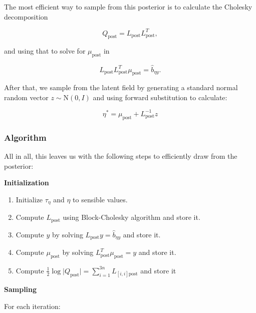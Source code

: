 \documentclass[
  letterpaper,
  DIV=11,
  numbers=noendperiod]{scrartcl}
\providecommand{\tightlist}{%
  \setlength{\itemsep}{0pt}\setlength{\parskip}{0pt}}\usepackage{longtable,booktabs,array}
\begin{document}
The most efficient way to sample from this posterior is to calculate the
Cholesky decomposition

\[
Q_{\text{post}} = L_{\text{post}}L_{\text{post}}^T,
\]

and using that to solve for \(\mu_\text{post}\) in

\[
L_{\text{post}}L_{\text{post}}^T \mu_\text{post} = \hat b_{\eta y}.
\]

After that, we sample from the latent field by generating a standard
normal random vector \(z \sim \mathrm N(0, I)\) and using forward
substitution to calculate:

\[
\eta^* = \mu_\text{post} + L_\text{post}^{-1}z
\]

\subsubsection{Algorithm}\label{algorithm}

All in all, this leaves us with the following steps to efficiently draw
from the posterior:

\textbf{Initialization}

\begin{enumerate}
\def\labelenumi{\arabic{enumi}.}
\tightlist
\item
  Initialize \(\tau_\eta\) and \(\eta\) to sensible values.
\item
  Compute \(L_\text{post}\) using Block-Cholesky algorithm and store it.
\item
  Compute \(y\) by solving \(L_\text{post}y = \hat b_{\eta y}\) and
  store it.
\item
  Compute \(\mu_\text{post}\) by solving
  \(L_\text{post}^T\mu_\text{post} = y\) and store it.
\item
  Compute
  \(\frac12\log\vert Q_\text{post}\vert = \sum_{i=1}^{3n} L_{[i,i] \text{post}}\)
  and store it
\end{enumerate}

\textbf{Sampling}

For each iteration:
\end{document}
